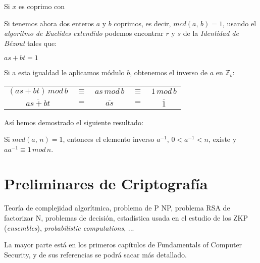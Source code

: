 \begin{theorem}[Euler]
	Si $x$ es coprimo con 
\end{theorem}


\hfil

Si tenemos ahora dos enteros $a$ y $b$ coprimos, es decir, $mcd(a,\,b) = 1$, usando el \textit{algoritmo de Euclides extendido} podemos encontrar $r$ y $s$ de la \textit{Identidad de Bézout} tales que:
\begin{center}
	$ as + bt = 1 $
\end{center}

Si a esta igualdad le aplicamos módulo $b$, obtenemos el inverso de $a$ en $\mathbb{Z}_b$:
\begin{center}
	\begin{tabular}{ccccc}
	$  ( as + bt ) \, mod \, b $ & $\equiv $ & $as \, mod \, b $ & $ \equiv$ & $1 \, mod \, b $ \\
	$ \overline{as+bt} $ & $=$ & $\overline{as} $ & $=$ & $\overline{1} $
\end{tabular}
\end{center}

Así hemos demostrado el siguiente resultado:

\begin{proposition}
	Si $mcd(a,\,n) = 1$, entonces el elemento inverso $a^{-1}$, $0<a^{-1}<n$, existe y $a a^{-1} \equiv 1 \, mod \, n$.
\end{proposition}


\hfil



\section{Preliminares de Criptografía}

Teoría de complejidad algorítmica, problema de P NP, problema RSA de factorizar N, problemas de decisión, estadística usada en el estudio de los ZKP (\textit{ensembles}), \textit{probabilistic computations}, ...

La mayor parte está en los primeros capítulos de Fundamentals of Computer Security, y de sus referencias se podrá sacar más detallado.

